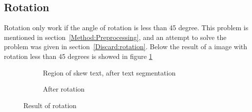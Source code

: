 \documentclass[Report.tex]{subfiles}
\begin{document}
\subsection*{Rotation}
Rotation only work if the angle of rotation is less than 45 degree. This problem is mentioned in section~\ref{Method:Preprocessing}, and an attempt to solve the problem was given in section~\ref{Discard:rotation}. Below the result of a image with rotation less than 45 degrees is showed in figure \ref{fig:result:rotation}

\begin{figure}[ht]
  \centering
  \begin{subfigure}[t]{6cm}
    \caption{Region of skew text, after text segmentation}
  \end{subfigure}
  \hspace{2cm}%
  \begin{subfigure}[t]{6cm}
    \caption{After rotation}
  \end{subfigure}

  \caption{Result of rotation}
  \label{fig:result:rotation}
\end{figure}
\end{document}
